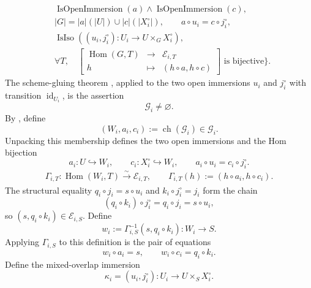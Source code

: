 \begin{definition}
\[\begin{aligned}
    &\operatorname{IsOpenImmersion}(a)\wedge
      \operatorname{IsOpenImmersion}(c),\\
    &|G|=|a|(|U|)\cup |c|(|X_i^\circ|),\qquad
      a\circ u_i=c\circ j_i^\circ,\\
    &\operatorname{IsIso}\!\left(
       (u_i,j_i^\circ)\colon
       U_i\longrightarrow U\times_GX_i^\circ\right),\\
    &\forall T,\quad
      \left[
      \begin{array}{rcl}
        \operatorname{Hom}(G,T)&\longrightarrow&\mathscr E_{i,T}\\
        h&\longmapsto&(h\circ a,h\circ c)
      \end{array}
      \right]\text{ is bijective}
      \bigr\}.
  \end{aligned}                                                     \tag{26e}
  \]
  The scheme-gluing theorem
  \cite[\href{https://stacks.math.columbia.edu/tag/01JA}{Tag 01JA}]
  {stacks-project}, applied to the two open immersions $u_i$ and $j_i^\circ$
  with transition $\operatorname{id}_{U_i}$, is the assertion
  \[
    \mathscr G_i\neq\varnothing.                                  \tag{26f}
  \]
  By , define
  \[
    (W_i,a_i,c_i):=\operatorname{ch}(\mathscr G_i)\in\mathscr G_i.
  \]
  Unpacking this membership defines the two open immersions and the Hom
  bijection
  \[
    a_i\colon U\hookrightarrow W_i,\qquad
    c_i\colon X_i^\circ\hookrightarrow W_i,\qquad
    a_i\circ u_i=c_i\circ j_i^\circ.                              \tag{27}
  \]
  \[
  \begin{gathered}
    \Gamma_{i,T}\colon\operatorname{Hom}(W_i,T)
      \xrightarrow{\sim}\mathscr E_{i,T},\qquad
    \Gamma_{i,T}(h):=(h\circ a_i,h\circ c_i).
  \end{gathered}                                                    \tag{27a}
  \]
  The structural equality $q_i\circ j_i=s\circ u_i$ and
  $k_i\circ j_i^\circ=j_i$ form the chain
  \[
    (q_i\circ k_i)\circ j_i^\circ
      =q_i\circ j_i
      =s\circ u_i,
  \]
  so $(s,q_i\circ k_i)\in\mathscr E_{i,S}$.  Define
  \[
    w_i:=\Gamma_{i,S}^{-1}(s,q_i\circ k_i)\colon W_i\to S.
  \]
  Applying $\Gamma_{i,S}$ to this definition is the pair of equations
  \[
    w_i\circ a_i=s,\qquad
    w_i\circ c_i=q_i\circ k_i.                                    \tag{28}
  \]
  Define the mixed-overlap immersion
  \[
    \kappa_i=(u_i,j_i^\circ)\colon U_i\to U\times_SX_i^\circ.     \tag{29}
  \]
\end{definition}

